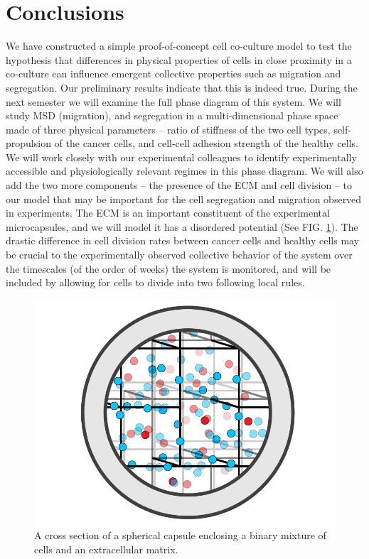 \documentclass[aps,prb,twocolumn,groupedaddress,nofootinbib,floatfix]{revtex4}
\begin{document}
\section*{Conclusions}
We have constructed a simple proof-of-concept cell co-culture model to test the hypothesis that differences in physical properties of cells in close proximity in a co-culture can influence emergent collective properties such as migration
and segregation. Our preliminary results indicate that this is indeed true. During the next semester we will examine the full phase diagram of this system. We will study MSD (migration), and segregation in a multi-dimensional phase space
made of three physical parameters -- ratio of stiffness of the two cell types, self-propulsion of the cancer cells, and cell-cell adhesion strength of the healthy cells. We will work closely with our experimental colleagues to identify experimentally
accessible and physiologically relevant regimes in this phase diagram. We will also add the two more components -- the presence of the ECM and cell division -- to our model that may be important for the cell segregation and migration observed in experiments. The ECM is an important constituent of the experimental microcapsules, and we will model it has a disordered potential  (See FIG. \ref{fig:capsuleECM}). The drastic difference in cell division rates between cancer cells and healthy cells may be crucial to the experimentally observed collective behavior of the system over the timescales (of the order of weeks) the system is monitored, and will be included by allowing for cells to divide into two following local rules. 

\begin{figure}
  \includegraphics[width=0.9\columnwidth]{Fig2.png}
  \caption[capsuleECM]
   {A cross section of a spherical capsule enclosing a binary mixture of 
   cells and an extracellular matrix.}
   \label{fig:capsuleECM}
\end{figure}
\end{document}
